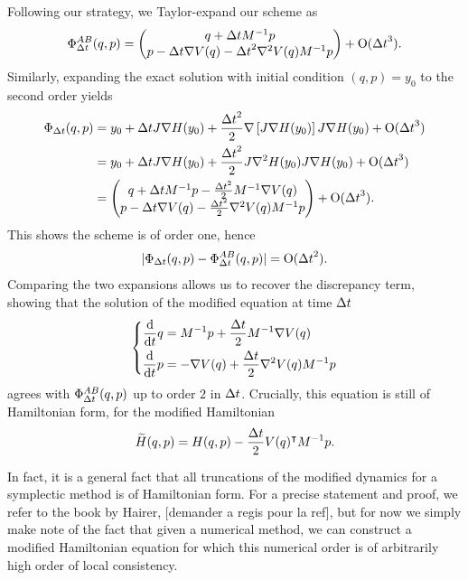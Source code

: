     \begin{example}
        \label{ex:modified_hamiltonian}
         Following our strategy, we Taylor-expand our scheme as
        \[\Phi_{{\Delta t}}^{AB}(q,p)=\begin{pmatrix}q+{\Delta t} M^{-1}p \\ p- {\Delta t} \nabla V(q) - {\Delta t}^2 \nabla^2 V(q) M^{-1}p\end{pmatrix}+\mathrm{O}({\Delta t}^3).\]
        Similarly, expanding the exact solution with initial condition $(q,p)=y_0$ to the second order yields
        \begin{align*} \Phi_{\Delta t}(q,p)&= y_0 +{\Delta t} J\nabla H(y_0)+\frac{{\Delta t}^2}2\nabla\left[J\nabla H(y_0)\right]J\nabla H(y_0)+\mathrm{O}({\Delta t}^3)\\
        &=y_0+{\Delta t} J\nabla H(y_0) + \frac{{\Delta t}^2}{2}J\nabla^2 H(y_0)J \nabla H(y_0)+\mathrm{O}({\Delta t}^3)\\
        &=\begin{pmatrix}q+{\Delta t} M^{-1}p -\frac{{\Delta t}^2}{2}M^{-1}\nabla V(q) \\ p -{\Delta t} \nabla V(q)-\frac{{\Delta t}^2}2\nabla^2 V(q)M^{-1}p\end{pmatrix}+\mathrm{O}({\Delta t}^3).\end{align*}
        This shows the scheme is of order one, hence
        \[|\Phi_{{\Delta t}}(q,p)-\Phi_{{\Delta t}}^{AB}(q,p)|=\mathrm{O}({\Delta t}^2).\]
        Comparing the two expansions allows us to recover the discrepancy term, showing that the solution of the modified equation at time ${\Delta t}$
        \[\left\{\begin{aligned}\frac{\mathrm d}{\mathrm{d}t} q &= M^{-1}p +\frac{{\Delta t}}2M^{-1}\nabla V(q)\\
        \frac{\mathrm d}{\mathrm{d}t} p &= -\nabla V(q) +\frac{{\Delta t}}2\nabla^2 V(q)M^{-1}p\end{aligned}\right.\]
        agrees with $\Phi_{{\Delta t}}^{AB}(q,p)$ up to order $2$ in ${\Delta t}$. Crucially, this equation is still of Hamiltonian form, for the modified Hamiltonian
        \begin{equation}\label{eq:modified_hamiltonian}\widetilde{H}(q,p)=H(q,p)-\frac{{\Delta t}}2 V(q)^\intercal M^{-1}p.\end{equation}
    \end{example}
    In fact, it is a general fact that all truncations of the modified dynamics for a symplectic method is of Hamiltonian form.
    For a precise statement and proof, we refer to the book by Hairer, [demander a regis pour la ref], but for now we simply make note of the fact
    that given a numerical method, we can construct a modified Hamiltonian equation for which this numerical order is of arbitrarily high order of local consistency.
